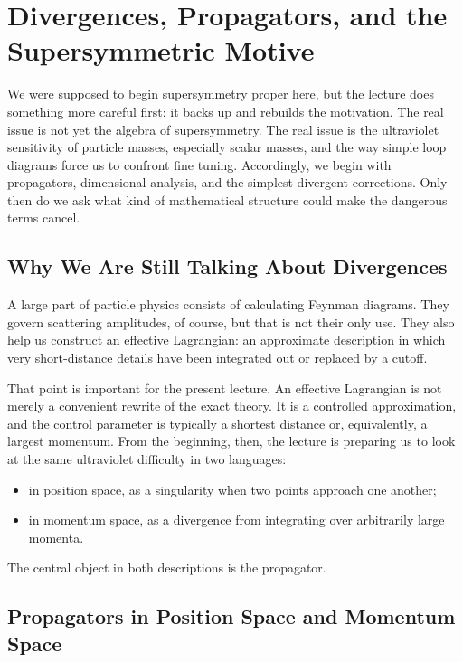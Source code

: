 \chapter{Divergences, Propagators, and the Supersymmetric Motive}

We were supposed to begin supersymmetry proper here, but the lecture does something more careful first: it backs up and rebuilds the motivation. The real issue is not yet the algebra of supersymmetry. The real issue is the ultraviolet sensitivity of particle masses, especially scalar masses, and the way simple loop diagrams force us to confront fine tuning. Accordingly, we begin with propagators, dimensional analysis, and the simplest divergent corrections. Only then do we ask what kind of mathematical structure could make the dangerous terms cancel.

\section{Why We Are Still Talking About Divergences}

A large part of particle physics consists of calculating Feynman diagrams. They govern scattering amplitudes, of course, but that is not their only use. They also help us construct an effective Lagrangian: an approximate description in which very short-distance details have been integrated out or replaced by a cutoff.

That point is important for the present lecture. An effective Lagrangian is not merely a convenient rewrite of the exact theory. It is a controlled approximation, and the control parameter is typically a shortest distance or, equivalently, a largest momentum. From the beginning, then, the lecture is preparing us to look at the same ultraviolet difficulty in two languages:
\begin{itemize}
\item in position space, as a singularity when two points approach one another;
\item in momentum space, as a divergence from integrating over arbitrarily large momenta.
\end{itemize}

The central object in both descriptions is the propagator.

\section{Propagators in Position Space and Momentum Space}

